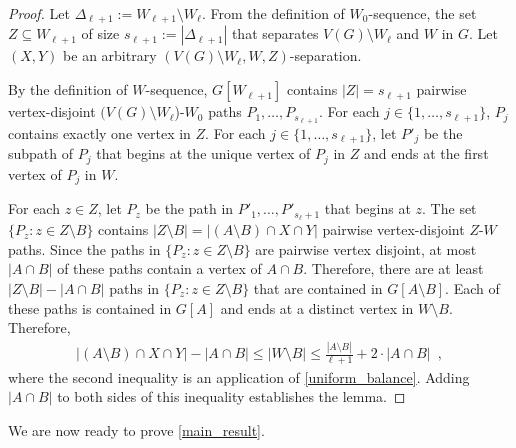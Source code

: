 \documentclass{patmorin}
\begin{document}
\begin{proof}
  Let $\Delta_{\ell+1}:=W_{\ell+1}\setminus W_\ell$.
  From the definition of $W_0$-sequence, the set $Z\subseteq W_{\ell+1}$ of size $s_{\ell+1}:=|\Delta_{\ell+1}|$ that separates $V(G)\setminus W_\ell$ and $W$ in $G$.  Let $(X,Y)$ be an arbitrary $(V(G)\setminus W_\ell, W,Z)$-separation.

  By the definition of $W$-sequence, $G[W_{\ell+1}]$ contains $|Z|=s_{\ell+1}$ pairwise vertex-disjoint $(V(G)\setminus W_{\ell}$)-$W_0$ paths $P_1,\ldots,P_{s_{\ell+1}}$.
  For each $j\in\{1,\ldots,s_{\ell+1}\}$, $P_j$ contains exactly one vertex in $Z$.  For each $j\in\{1,\ldots,s_{\ell+1}\}$, let $P'_j$ be the subpath of $P_j$ that begins at the unique vertex of $P_j$ in $Z$ and ends at the first vertex of $P_j$ in $W$.

  For each $z\in Z$, let $P_z$ be the path in $P'_1,\ldots,P'_{s_\ell+1}$ that begins at $z$.
  The set $\{P_z:z\in Z\setminus B\}$ contains $|Z\setminus B|=|(A\setminus B)\cap X\cap Y|$ pairwise vertex-disjoint $Z$-$W$ paths.
  Since the paths in $\{P_z:z\in Z\setminus B\}$ are pairwise vertex disjoint, at most $|A\cap B|$ of these paths contain a vertex of $A\cap B$. Therefore, there are at least $|Z\setminus B|-|A\cap B|$ paths in $\{P_z:z\in Z\setminus B\}$ that are contained in $G[A\setminus B]$.  Each of these paths is contained in $G[A]$ and ends at a distinct vertex in $W\setminus B$.  Therefore,
  \begin{align*}
     |(A\setminus B)\cap X\cap Y|-|A\cap B| \le |W\setminus B| \le
     \frac{|A\setminus B|}{\ell+1}+2\cdot |A\cap B| \enspace ,
  \end{align*}
  where the second inequality is an application of \cref{uniform_balance}.  Adding $|A\cap B|$ to both sides of this inequality establishes the lemma.
\end{proof}

We are now ready to prove \cref{main_result}.
\end{document}
